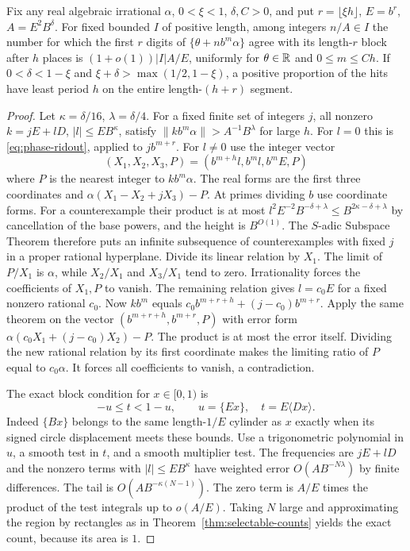 \begin{theorem}\label{thm:fractional-fixed}
Fix any real algebraic irrational \(\alpha\), \(0<\xi<1\),
\(\delta,C>0\), and put \(r=\lfloor\xi h\rfloor\), \(E=b^r\),
\(A=E^2B^\delta\). For fixed bounded \(I\) of positive length,
among integers \(n/A\in I\) the number for which the first \(r\)
digits of \(\{\theta+n b^m\alpha\}\) agree with its length-\(r\)
block after \(h\) places is \((1+o(1))|I|A/E\), uniformly for
\(\theta\in\mathbb R\) and \(0\le m\le Ch\).
If \(0<\delta<1-\xi\) and
\(\xi+\delta>\max(1/2,1-\xi)\), a positive proportion of the hits
have least period \(h\) on the entire length-\((h+r)\) segment.
\end{theorem}

\begin{proof}
Let \(\kappa=\delta/16\), \(\lambda=\delta/4\).
For a fixed finite set of integers \(j\), all nonzero
\(k=jE+lD\), \(|l|\le EB^\kappa\), satisfy
\(\|k b^m\alpha\|>A^{-1}B^\lambda\) for large \(h\).
For \(l=0\) this is \eqref{eq:phase-ridout}, applied to
\(j b^{m+r}\). For \(l\ne0\) use the integer vector
\[
     (X_1,X_2,X_3,P)=(b^{m+h}l,b^m l,b^mE,P)
\]
where \(P\) is the nearest integer to \(k b^m\alpha\).
The real forms are the first three coordinates and
\(\alpha(X_1-X_2+jX_3)-P\). At primes dividing \(b\) use coordinate
forms. For a counterexample their product is at most
\(l^2 E^{-2}B^{-\delta+\lambda}\le B^{2\kappa-\delta+\lambda}\)
by cancellation of the base powers, and the height is \(B^{O(1)}\).
The \(S\)-adic Subspace Theorem \cite{Bilu} therefore puts an
infinite subsequence of counterexamples with fixed \(j\)
in a proper rational hyperplane. Divide its linear relation
by \(X_1\). The limit of \(P/X_1\) is \(\alpha\), while
\(X_2/X_1\) and \(X_3/X_1\) tend to zero. Irrationality
forces the coefficients of \(X_1,P\) to vanish.
The remaining relation gives \(l=c_0 E\) for a fixed nonzero
rational \(c_0\). Now \(k b^m\) equals
\(c_0 b^{m+r+h}+(j-c_0)b^{m+r}\).
Apply the same theorem on the vector
\((b^{m+r+h},b^{m+r},P)\) with error form
\(\alpha(c_0 X_1+(j-c_0)X_2)-P\).
The product is at most the error itself.
Dividing the new rational relation by its first coordinate
makes the limiting ratio of \(P\) equal to \(c_0\alpha\).
It forces all coefficients to vanish, a contradiction.

The exact block condition for \(x\in[0,1)\) is
\[
 -u\le t<1-u,\qquad u=\{Ex\},\quad t=E\langle Dx\rangle .
\]
Indeed \(\{Bx\}\) belongs to the same length-\(1/E\) cylinder
as \(x\) exactly when its signed circle displacement meets
these bounds. Use a trigonometric polynomial in \(u\), a smooth
test in \(t\), and a smooth multiplier test. The frequencies
are \(jE+lD\) and the nonzero terms with \(|l|\le EB^\kappa\)
have weighted error \(O(AB^{-N\lambda})\) by finite differences.
The tail is \(O(AB^{-\kappa(N-1)})\).
The zero term is \(A/E\) times the product of the test integrals
up to \(o(A/E)\). Taking \(N\) large and approximating the
region by rectangles as in Theorem~\ref{thm:selectable-counts}
yields the exact count, because its area is \(1\).


\end{proof}
